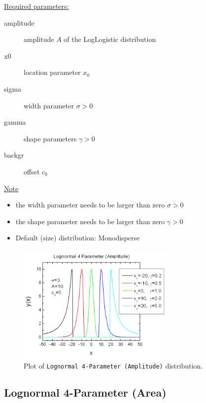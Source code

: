 \uline{Required parameters:}
\begin{description}
    \item[amplitude] amplitude $A$ of the LogLogistic distribution
    \item[x0] location parameter $x_0$
    \item[sigma] width parameter $\sigma > 0$
    \item[gamma] shape parameters $\gamma > 0$
    \item[backgr] offset $c_0$
\end{description}

\uline{Note}
\begin{itemize}
  \item the width parameter needs to be larger than zero $\sigma > 0$
  \item the shape parameter needs to be larger than zero $\gamma > 0$
  \item Default (size) distribution: Monodisperse
\end{itemize}

\begin{figure}[htb]
\begin{center}
\includegraphics[width=0.6824\textwidth]{LogNormal4ParameterAmplitude.png}
\end{center}
\caption{Plot of \texttt{Lognormal 4-Parameter (Amplitude)} distribution.}
\label{fig:LogNormal4ParameterAmplitude}
\end{figure}
\clearpage
\subsection{Lognormal 4-Parameter (Area)} ~\\
\label{sec:LogNormal4ParameterArea}

